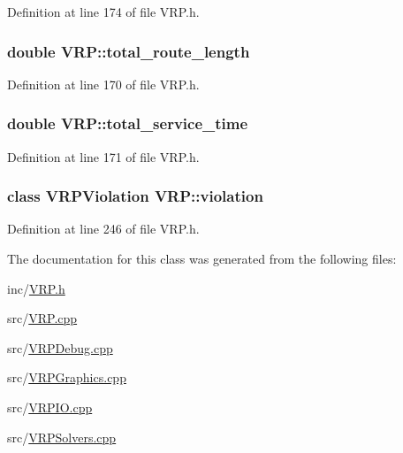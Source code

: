 Definition at line 174 of file VRP.h.

\hypertarget{class_v_r_p_a4c206d5757a64335ad660ad03116c376}{
\subsubsection[{total\_\-route\_\-length}]{\setlength{\rightskip}{0pt plus 5cm}double {\bf VRP::total\_\-route\_\-length}}}
\label{class_v_r_p_a4c206d5757a64335ad660ad03116c376}


Definition at line 170 of file VRP.h.

\hypertarget{class_v_r_p_a8e6219158b959b07443ecee7508f820b}{
\subsubsection[{total\_\-service\_\-time}]{\setlength{\rightskip}{0pt plus 5cm}double {\bf VRP::total\_\-service\_\-time}}}
\label{class_v_r_p_a8e6219158b959b07443ecee7508f820b}


Definition at line 171 of file VRP.h.

\hypertarget{class_v_r_p_a3bd307863feb6d22fb036771d76d0f48}{
\subsubsection[{violation}]{\setlength{\rightskip}{0pt plus 5cm}class {\bf VRPViolation} {\bf VRP::violation}}}
\label{class_v_r_p_a3bd307863feb6d22fb036771d76d0f48}


Definition at line 246 of file VRP.h.



The documentation for this class was generated from the following files:\begin{DoxyCompactItemize}
\item 
inc/\hyperlink{_v_r_p_8h}{VRP.h}\item 
src/\hyperlink{_v_r_p_8cpp}{VRP.cpp}\item 
src/\hyperlink{_v_r_p_debug_8cpp}{VRPDebug.cpp}\item 
src/\hyperlink{_v_r_p_graphics_8cpp}{VRPGraphics.cpp}\item 
src/\hyperlink{_v_r_p_i_o_8cpp}{VRPIO.cpp}\item 
src/\hyperlink{_v_r_p_solvers_8cpp}{VRPSolvers.cpp}\end{DoxyCompactItemize}
